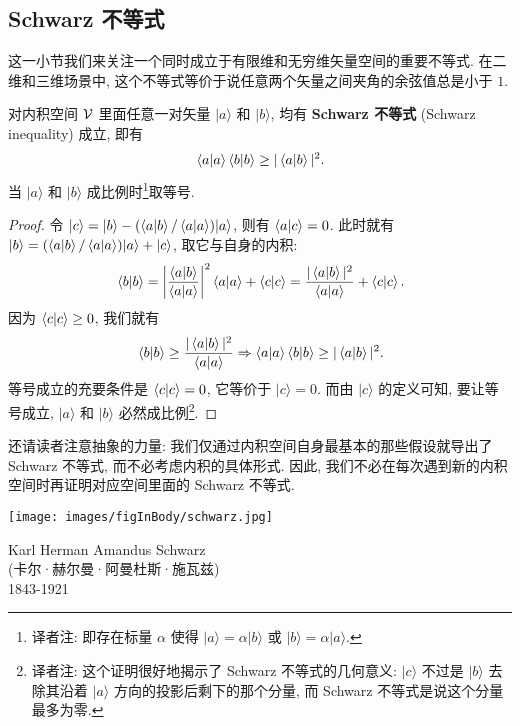 \documentclass[lang=cn,zihao=-4,twoside,fontset=none]{textbook}
\def\eq#1{\[\begin{aligned}{}#1\end{aligned}\]}
\renewcommand{\ket}[1]{| #1 \rangle}
\begin{document}
\newpage
\subsection{Schwarz 不等式}\label{sec:2.2.3}

这一小节我们来关注一个同时成立于有限维和无穷维矢量空间的重要不等式. 在二维和三维场景中, 这个不等式等价于说任意两个矢量之间夹角的余弦值总是小于 $1$.

\begin{theorem}
    \label{thm:2.2.7}%
    对内积空间 ${\mathcal V}$ 里面任意一对矢量 $\ket{a}$ 和 $\ket{b}$, 均有 \textbf{Schwarz 不等式} (Schwarz inequality) 成立, 即有 
    \eq{
        \braket{a}{a}\braket{b }{b }\geq|\braket{a }{b }|^2.
    }
    当 $\ket{a}$ 和 $\ket{b}$ 成比例时\footnote{译者注: 即存在标量 $\alpha$ 使得 $\ket{a}=\alpha\ket{b}$ 或 $\ket{b}=\alpha\ket{a}$.}取等号.
\end{theorem}

\begin{proof}
    令 $\ket{c}=\ket{b}-(\braket{a }{b }/\braket{a }{a})\ket{a}$, 则有 $\braket{a }{c}=0$. 此时就有 $\ket{b}=(\braket{a }{b }/\braket{a }{a})\ket{a}+\ket{c}$, 取它与自身的内积:
    \eq{
        \braket{b }{b}=\abs{\frac{\braket{a }{b }}{\braket{a }{a}}}^2\braket{a }{a}+\braket{c }{c}=\frac{|\braket{a }{b}|^2}{\braket{a }{a}}+\braket{c }{c}.
    }
    因为 $\braket{c }{c}\geq 0$, 我们就有 
    \eq{
        \braket{b }{b}\geq \frac{|\braket{a }{b}|^2}{\braket{a }{a}} \Rightarrow \braket{a }{a}\braket{b }{b}\geq|\braket{a }{b}|^2.
    }
    等号成立的充要条件是 $\braket{c }{c}=0$, 它等价于 $\ket{c}=0$. 而由 $\ket{c}$ 的定义可知, 要让等号成立, $\ket{a}$ 和 $\ket{b}$ 必然成比例\footnote{译者注: 这个证明很好地揭示了 Schwarz 不等式的几何意义: $\ket{c}$ 不过是 $\ket{b}$ 去除其沿着 $\ket{a}$ 方向的投影后剩下的那个分量, 而 Schwarz 不等式是说这个分量最多为零.}. 
\end{proof}

还请读者注意抽象的力量: 我们仅通过内积空间自身最基本的那些假设就导出了 Schwarz 不等式, 而不必考虑内积的具体形式. 因此, 我们不必在每次遇到新的内积空间时再证明对应空间里面的 Schwarz 不等式. 

\begin{marginfigure}
    \centering
    \texttt{[image: images/figInBody/schwarz.jpg]}
    \caption*{Karl Herman Amandus Schwarz \\(卡尔·赫尔曼·阿曼杜斯·施瓦兹) \\ 1843-1921}
\end{marginfigure}
\end{document}
